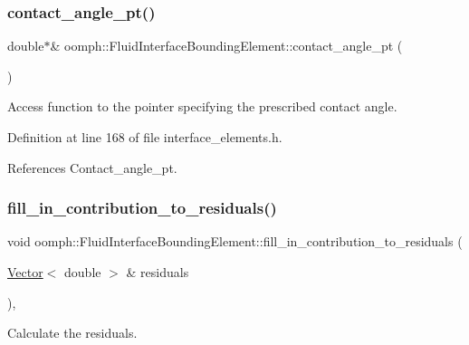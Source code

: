 \subsubsection{\texorpdfstring{contact\+\_\+angle\+\_\+pt()}{contact\_angle\_pt()}}
{\footnotesize\ttfamily double$\ast$\& oomph\+::\+Fluid\+Interface\+Bounding\+Element\+::contact\+\_\+angle\+\_\+pt (\begin{DoxyParamCaption}{ }\end{DoxyParamCaption})\hspace{0.3cm}{\ttfamily [inline]}}



Access function to the pointer specifying the prescribed contact angle. 



Definition at line 168 of file interface\+\_\+elements.\+h.



References Contact\+\_\+angle\+\_\+pt.

\mbox{\label{classoomph_1_1FluidInterfaceBoundingElement_acaa709e7a402418fb03f2bf0f57f53ea}} 
\subsubsection{\texorpdfstring{fill\+\_\+in\+\_\+contribution\+\_\+to\+\_\+residuals()}{fill\_in\_contribution\_to\_residuals()}}
{\footnotesize\ttfamily void oomph\+::\+Fluid\+Interface\+Bounding\+Element\+::fill\+\_\+in\+\_\+contribution\+\_\+to\+\_\+residuals (\begin{DoxyParamCaption}\item[{\hyperlink{classoomph_1_1Vector}{Vector}$<$ double $>$ \&}]{residuals }\end{DoxyParamCaption})\hspace{0.3cm}{\ttfamily [inline]}, {\ttfamily [virtual]}}



Calculate the residuals. 




